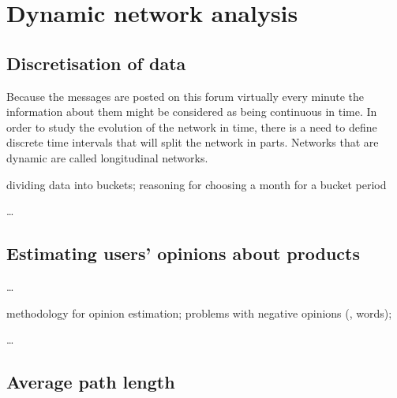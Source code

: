 \section{Dynamic network analysis}

  \subsection{Discretisation of data}
  
    Because the messages are posted on this forum virtually every minute the information about them might be considered as being continuous in time. In order to study the evolution of the network in time, there is a need to define discrete time intervals that will split the network in parts. Networks that are dynamic are called longitudinal networks.
    
    dividing data into buckets; reasoning for choosing a month for a bucket period
    
    \ldots
    
  \subsection{Estimating users' opinions about products}
  
    \ldots
    
    methodology for opinion estimation; problems with negative opinions (,  words);
    
    \ldots
  
  \subsection{Average path length}

